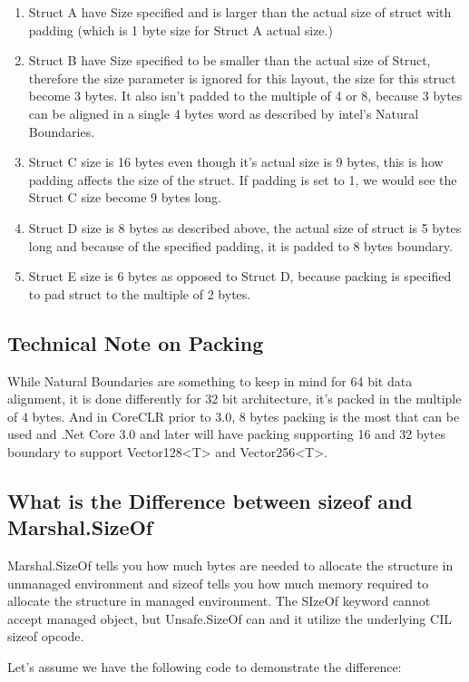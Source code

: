 \begin{enumerate}
	\item Struct A have Size specified and is larger than the actual size of struct with padding (which is 1 byte size for Struct A actual size.)
	\item Struct B have Size specified to be smaller than the actual size of Struct, therefore the size parameter is ignored for this layout, the size for this struct become 3 bytes. It also isn't padded to the multiple of 4 or 8, because 3 bytes can be aligned in a single 4 bytes word as described by intel's Natural Boundaries.
	\item Struct C size is 16 bytes even though it's actual size is 9 bytes, this is how padding affects the size of the struct. If padding is set to 1, we would see the Struct C size become 9 bytes long.
	\item Struct D size is 8 bytes as described above, the actual size of struct is 5 bytes long and because of the specified padding, it is padded to 8 bytes boundary.
	\item Struct E size is 6 bytes as opposed to Struct D, because packing is specified to pad struct to the multiple of 2 bytes.
\end{enumerate}

\subsection{Technical Note on Packing}
While Natural Boundaries are something to keep in mind for 64 bit data alignment, it is done differently for 32 bit architecture, it's packed in the multiple of 4 bytes. And in CoreCLR prior to 3.0, 8 bytes packing is the most that can be used and .Net Core 3.0 and later will have packing supporting 16 and 32 bytes boundary to support Vector128<T> and Vector256<T>. 

\subsection{What is the Difference between sizeof and Marshal.SizeOf}
Marshal.SizeOf tells you how much bytes are needed to allocate the structure in unmanaged environment and sizeof tells you how much memory required to allocate the structure in managed environment. The SIzeOf keyword cannot accept managed object, but Unsafe.SizeOf can and it utilize the underlying CIL sizeof opcode.

Let's assume we have the following code to demonstrate the difference:

